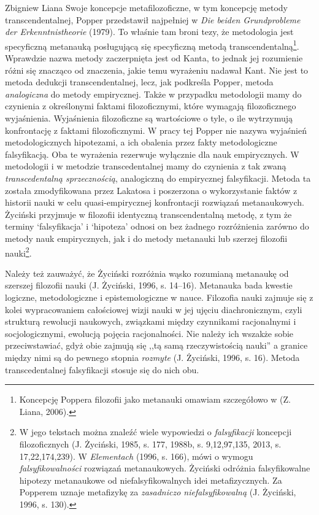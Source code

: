 \begin{artplenv}{Zbigniew Liana}
Swoje koncepcje metafilozoficzne, w tym koncepcję metody transcendentalnej, Popper przedstawił
najpełniej w \textit{Die beiden Grundprobleme der Erkenntnistheorie} \label{ref:RNDZjoA35m8Sx}(1979). To właśnie tam broni tezy, że
metodologia jest specyficzną metanauką posługującą się specyficzną metodą transcendentalną\footnote{Koncepcję Poppera
filozofii jako metanauki omawiam szczegółowo w \label{ref:RNDfY6Fw7eCi8}(Z. Liana, 2006).}. Wprawdzie nazwa metody
zaczerpnięta jest od Kanta, to jednak jej rozumienie różni się znacząco od znaczenia, jakie temu wyrażeniu nadawał
Kant. Nie jest to metoda dedukcji transcendentalnej, lecz, jak podkreśla Popper, metoda \textit{analogiczna} do metody
empirycznej. Także w przypadku metodologii mamy do czynienia z określonymi faktami filozoficznymi, które wymagają
filozoficznego wyjaśnienia. Wyjaśnienia filozoficzne są wartościowe o tyle, o ile wytrzymują konfrontację z faktami
filozoficznymi. W pracy tej Popper nie nazywa wyjaśnień metodologicznych hipotezami, a ich obalenia przez fakty
metodologiczne falsyfikacją. Oba te wyrażenia rezerwuje wyłącznie dla nauk empirycznych. W metodologii i w metodzie
transcedentalnej mamy do czynienia z tak zwaną \textit{transcedentalną sprzecznością}, analogiczną do empirycznej
falsyfikacji. Metoda ta została zmodyfikowana przez Lakatosa i poszerzona o wykorzystanie faktów z historii nauki w celu
quasi-empirycznej konfrontacji rozwiązań metanaukowych. Życiński przyjmuje w filozofii identyczną transcendentalną
metodę, z tym że terminy `falsyfikacja' i `hipoteza' odnosi on bez żadnego rozróżnienia zarówno do metody nauk
empirycznych, jak i do metody metanauki lub szerzej filozofii nauki\footnote{W jego tekstach można znaleźć wiele
wypowiedzi o \textit{falsyfikacji }koncepcji filozoficznych \label{ref:RNDlMUuFKby8S}(J. Życiński, 1985, s. 177, 1988b,
s. 9,12,97,135, 2013, s. 17,22,174,239).  W \textit{Elementach} \label{ref:RNDCkkQxwcbWF}(1996, s. 166), mówi o wymogu
\textit{falsyfikowalności} rozwiązań metanaukowych. Życiński odróżnia falsyfikowalne hipotezy metanaukowe od
niefalsyfikowalnych idei metafizycznych. Za Popperem uznaje metafizykę za \textit{zasadniczo niefalsyfikowalną}
\label{ref:RNDA2elxmxDEm}(J. Życiński, 1996, s. 130).}.

Należy też zauważyć, że Życiński rozróżnia wąsko rozumianą metanaukę od szerszej filozofii nauki
\label{ref:RNDSXNKAbqry1}(J. Życiński, 1996, s. 14–16). Metanauka bada kwestie logiczne,
metodologiczne i epistemologiczne w nauce. Filozofia nauki zajmuje się z kolei wypracowaniem całościowej wizji nauki w jej ujęciu
diachronicznym, czyli strukturą rewolucji naukowych, związkami między czynnikami racjonalnymi i socjologicznymi,
ewolucją pojęcia racjonalności. Nie należy ich wszakże sobie przeciwstawiać, gdyż obie zajmują się ,,tą samą
rzeczywistością nauki'' a granice między nimi są do pewnego stopnia \textit{rozmyte} \label{ref:RNDJqZXflfCwo}(J.
Życiński, 1996, s. 16). Metoda transcedentalnej falsyfikacji stosuje się do nich obu.


\end{artplenv}
